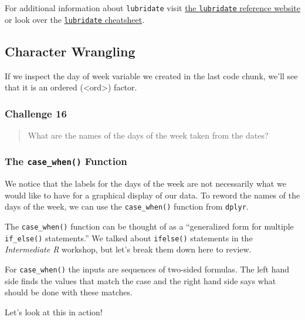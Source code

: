\documentclass[
  10pt,
  letterpaper,
  twoside,
  openright]{book}
\begin{document}
For additional information about \texttt{lubridate} visit
\href{https://lubridate.tidyverse.org/}{the \texttt{lubridate} reference
website} or look over the
\href{https://raw.githubusercontent.com/rstudio/cheatsheets/main/lubridate.pdf}{\texttt{lubridate}
cheatsheet}.

\hypertarget{character-wrangling}{%
\subsection{Character Wrangling}\label{character-wrangling}}

If we inspect the day of week variable we created in the last code
chunk, we'll see that it is an ordered (\textless ord\textgreater)
factor.

\hypertarget{challenge-16}{%
\subsubsection{Challenge 16}\label{challenge-16}}

\begin{quote}
What are the names of the days of the week taken from the dates?
\end{quote}

\hypertarget{the-case_when-function}{%
\subsubsection{\texorpdfstring{The \texttt{case\_when()}
Function}{The case\_when() Function}}\label{the-case_when-function}}

We notice that the labels for the days of the week are not necessarily
what we would like to have for a graphical display of our data. To
reword the names of the days of the week, we can use the
\texttt{case\_when()} function from \texttt{dplyr}.

The \texttt{case\_when()} function can be thought of as a ``generalized
form for multiple \texttt{if\_else()} statements.'' We talked about
\texttt{ifelse()} statements in the \emph{Intermediate R} workshop, but
let's break them down here to review.

For \texttt{case\_when()} the inputs are sequences of two-sided
formulas. The left hand side finds the values that match the case and
the right hand side says what should be done with these matches.

Let's look at this in action!
\end{document}
